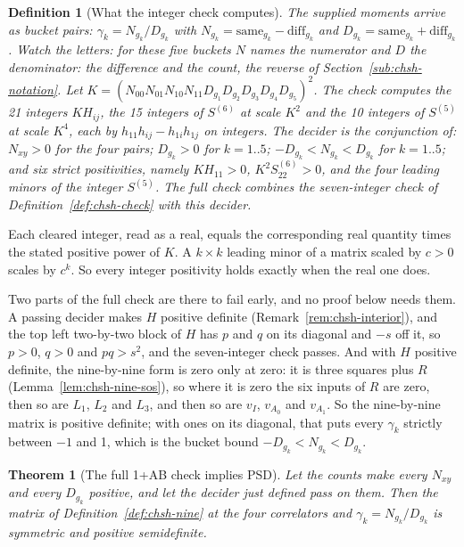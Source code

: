\documentclass[11pt,twoside]{article}
\theoremstyle{thielethm}
\newtheorem{theorem}{Theorem}[section]
\theoremstyle{thieledef}
\newtheorem{definition}{Definition}[section]
\theoremstyle{thieledef}
\theoremstyle{thieledef}
\theoremstyle{thielethm}
\theoremstyle{thieleobs}
\theoremstyle{thielethm}
\begin{document}
\begin{definition}[What the integer check computes]\label{def:chsh-g12345}
The supplied moments arrive as bucket pairs: $\gamma_k = N_{g_k}/D_{g_k}$ with
$N_{g_k} = \mathrm{same}_{g_k} - \mathrm{diff}_{g_k}$ and
$D_{g_k} = \mathrm{same}_{g_k} + \mathrm{diff}_{g_k}$. Watch the letters: for these five
buckets $N$ names the numerator and $D$ the denominator: the difference and the count, the reverse
of Section~\ref{sub:chsh-notation}. Let
$K = (N_{00} N_{01} N_{10} N_{11} D_{g_1} D_{g_2} D_{g_3} D_{g_4} D_{g_5})^2$. The check computes the 21 integers
$K H_{ij}$, the 15
integers of $S^{(6)}$ at scale $K^2$ and the 10 integers of $S^{(5)}$ at scale $K^4$, each by
$h_{11} h_{ij} - h_{1i} h_{1j}$ on integers. The
decider is the conjunction of: $N_{xy} > 0$ for the four
pairs; $D_{g_k} > 0$ for $k = 1..5$; $-D_{g_k} < N_{g_k} < D_{g_k}$ for $k = 1..5$; and six
strict positivities, namely $K H_{11} > 0$, $K^2 S^{(6)}_{22} > 0$, and the four leading
minors of the integer $S^{(5)}$. The full check
combines the seven-integer check of Definition~\ref{def:chsh-check} with this decider.
\end{definition}

Each cleared integer, read as a real, equals the
corresponding real quantity times the stated positive power of $K$. A $k \times k$ leading
minor of a matrix scaled by $c > 0$ scales by $c^k$. So every integer positivity holds exactly
when the real one does.

Two parts of the full check are there to fail early, and no proof below needs them. A passing
decider makes $H$ positive definite (Remark~\ref{rem:chsh-interior}), and the top left two-by-two
block of $H$ has $p$ and $q$ on its diagonal and $-s$ off it, so $p > 0$, $q > 0$ and $pq > s^2$,
and the seven-integer check passes. And with $H$ positive definite, the nine-by-nine form is zero
only at zero: it is three squares plus $R$ (Lemma~\ref{lem:chsh-nine-sos}), so where it is zero the
six inputs of $R$ are zero, then so are $L_1$, $L_2$ and $L_3$, and then so are $v_I$, $v_{A_0}$
and $v_{A_1}$. So the nine-by-nine matrix is positive definite; with ones on its diagonal, that puts every $\gamma_k$ strictly between
$-1$ and 1, which is the bucket bound $-D_{g_k} < N_{g_k} < D_{g_k}$.

\begin{theorem}[The full 1+AB check implies PSD]\label{thm:chsh-g12345}
Let the counts make every $N_{xy}$ and every $D_{g_k}$ positive, and let
the decider just defined pass on them. Then the matrix of
Definition~\ref{def:chsh-nine} at the four correlators and $\gamma_k = N_{g_k}/D_{g_k}$ is
symmetric and positive semidefinite.
\end{theorem}
\end{document}
